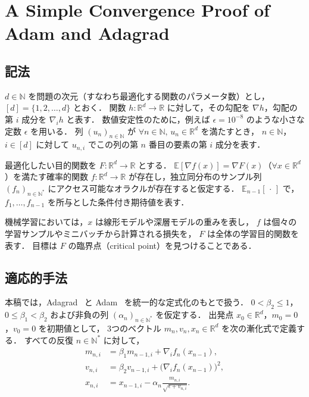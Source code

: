 \documentclass[dvipdfmx,a4paper,11pt]{jsarticle}
\begin{document}
\section{A Simple Convergence Proof of Adam and Adagrad}\label{pf:adam_and_adagrad}
\subsection{記法}

$d \in \mathbb{N}$ を問題の次元（すなわち最適化する関数のパラメータ数）とし，
$[d] = \{1, 2, \ldots, d\}$ とおく．
関数 $h : \mathbb{R}^d \to \mathbb{R}$ に対して，その勾配を $\nabla h$，勾配の第 $i$ 成分を $\nabla_i h$ と表す．
数値安定性のために，例えば $\epsilon = 10^{-8}$ のような小さな定数 $\epsilon$ を用いる．
列 $(u_n)_{n \in \mathbb{N}}$ が $\forall n \in \mathbb{N},\, u_n \in \mathbb{R}^d$ を満たすとき，
$n \in \mathbb{N}$，$i \in [d]$ に対して $u_{n,i}$ でこの列の第 $n$ 番目の要素の第 $i$ 成分を表す．

最適化したい目的関数を $F : \mathbb{R}^d \to \mathbb{R}$ とする．
$\mathbb{E}[\nabla f(x)] = \nabla F(x)$（$\forall x \in \mathbb{R}^d$）を満たす確率的関数
$f : \mathbb{R}^d \to \mathbb{R}$ が存在し，独立同分布のサンプル列 $(f_n)_{n \in \mathbb{N}^*}$
にアクセス可能なオラクルが存在すると仮定する．
$\mathbb{E}_{n-1}[\,\cdot\,]$ で，$f_1, \ldots, f_{n-1}$ を所与とした条件付き期待値を表す．

機械学習においては，$x$ は線形モデルや深層モデルの重みを表し，
$f$ は個々の学習サンプルやミニバッチから計算される損失を，
$F$ は全体の学習目的関数を表す．
目標は $F$ の臨界点（critical point）を見つけることである．

\subsection{適応的手法}

本稿では，Adagrad~\cite{duchi2011} と Adam~\cite{kingma2015} を統一的な定式化のもとで扱う．
$0 < \beta_2 \leq 1$，$0 \leq \beta_1 < \beta_2$ および非負の列 $(\alpha_n)_{n \in \mathbb{N}^*}$
を仮定する．
出発点 $x_0 \in \mathbb{R}^d$，$m_0 = 0$，$v_0 = 0$ を初期値として，
3つのベクトル $m_n, v_n, x_n \in \mathbb{R}^d$ を次の漸化式で定義する．
すべての反復 $n \in \mathbb{N}^*$ に対して，
\begin{align}
    m_{n,i} &= \beta_1 m_{n-1,i} + \nabla_i f_n(x_{n-1}), \label{eq:update_m} \\
    v_{n,i} &= \beta_2 v_{n-1,i} + \bigl(\nabla_i f_n(x_{n-1})\bigr)^2, \label{eq:update_v} \\
    x_{n,i} &= x_{n-1,i} - \alpha_n \frac{m_{n,i}}{\sqrt{\epsilon + v_{n,i}}}. \label{eq:update_x}
\end{align}
\end{document}
